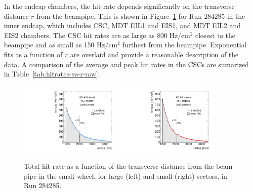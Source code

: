 In the endcap chambers, the hit rate depends significantly on the transverse distance $r$ from the beampipe. This is shown in Figure~\ref{fig:hitrates-vs-r-raw} for Run 284285 in the inner endcap, which includes CSC, MDT EIL1 and EIS1, and MDT EIL2 and EIS2 chambers. The CSC hit rates are as large as 800 $\text{Hz} / \text{cm}^2$ closest to the beampipe and as small as 150 $\text{Hz} / \text{cm}^2$ furthest from the beampipe. Exponential fits as a function of $r$ are overlaid and provide a reasonable description of the data. A comparison of the average and peak hit rates in the CSCs are sumarized in Table~\ref{tab:hitrates-vs-r-raw}.

\begin{figure}
  \begin{center}
    \includegraphics[width=0.45\textwidth]{./figures/rate_raw_vs_r_L_00284285.pdf}
    \includegraphics[width=0.45\textwidth]{./figures/rate_raw_vs_r_S_00284285.pdf}
    \caption{Total hit rate as a function of the transverse distance from the beam pipe in the small wheel, for large (left) and small (right) sectors, in Run 284285.}
    \label{fig:hitrates-vs-r-raw}
  \end{center}
\end{figure}

